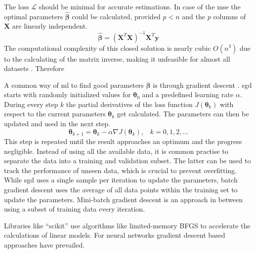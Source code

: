 The loss $\mathcal{L}$ should be minimal for accurate estimations. In case of the \gls{mse} the optimal parameters $\boldsymbol{\hat{\beta}}$ could be calculated, provided $p < n$ and the $p$ columns of $\mathbf{X}$ are linearly independent.
\begin{equation}
    \boldsymbol{\hat{\beta}} = (\mathbf{X}^T\mathbf{X})^{-1}\mathbf{X}^{T}\mathbf{y}
\end{equation}
The computational complexity of this closed solution is nearly cubic $O(n^3)$ due to the calculating of the matrix inverse, making it unfeasible for almost all datasets \autocite{riahi2023}. Therefore   

A common way of \gls{ml} to find good parameters $\boldsymbol{\beta}$ is through gradient descent \autocite{robbins1951}. 
\gls{sgd} starts with randomly initialized values for $\boldsymbol{\theta}_0$ and a predefined learning rate $\alpha$. 
During every step $k$ the partial derivatives of the loss function $J(\boldsymbol{\theta}_k)$ with respect to the current parameters $\boldsymbol{\theta}_k$ get calculated. The parameters can then be updated and used in the next step.
\begin{equation}
    \boldsymbol{\theta}_{k+1} = \boldsymbol{\theta}_k - \alpha\nabla J(\boldsymbol{\theta}_k)\text{,}\quad k=0,1,2,\ldots
\end{equation}
This step is repeated until the result approaches an optimum and the progress negligible. Instead of using all the available data, it is common practise to separate the data into a training and validation subset. The latter can be used to track the performance of unseen data, which is crucial to prevent overfitting. While \gls{sgd} uses a single sample per iteration to update the parameters, batch gradient descent uses the average of all data points within the training set to update the parameters. Mini-batch gradient descent is an approach in between using a subset of training data every iteration. 



Libraries like ``scikit'' use algorithms like limited-memory BFGS to accelerate the calculations of linear models. For neural networks gradient descent based approaches have prevailed.

